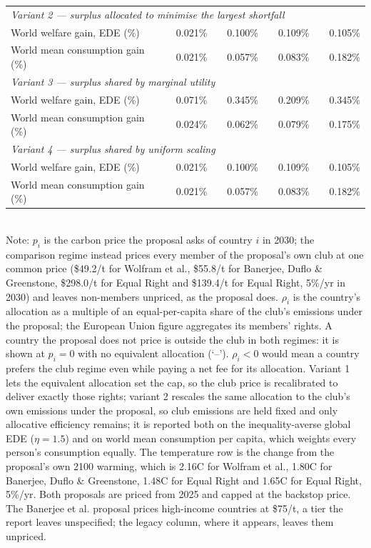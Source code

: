 \begin{table}[htbp]
\begin{tabular}{lcccccccc}
  \midrule
  \multicolumn{9}{l}{\textit{Variant 2 --- surplus allocated to minimise the largest shortfall}} \\
  \quad World welfare gain, EDE (\%) &  & 0.021\% &  & 0.100\% &  & 0.109\% &  & 0.105\% \\
  \quad World mean consumption gain (\%) &  & 0.021\% &  & 0.057\% &  & 0.083\% &  & 0.182\% \\
  \midrule
  \multicolumn{9}{l}{\textit{Variant 3 --- surplus shared by marginal utility}} \\
  \quad World welfare gain, EDE (\%) &  & 0.071\% &  & 0.345\% &  & 0.209\% &  & 0.345\% \\
  \quad World mean consumption gain (\%) &  & 0.024\% &  & 0.062\% &  & 0.079\% &  & 0.175\% \\
  \midrule
  \multicolumn{9}{l}{\textit{Variant 4 --- surplus shared by uniform scaling}} \\
  \quad World welfare gain, EDE (\%) &  & 0.021\% &  & 0.100\% &  & 0.109\% &  & 0.105\% \\
  \quad World mean consumption gain (\%) &  & 0.021\% &  & 0.057\% &  & 0.083\% &  & 0.182\% \\
  \bottomrule
\end{tabular}
\label{tab:equiv_rights_A}
\\[4pt]
{\footnotesize Note: $p_i$ is the carbon price the proposal asks of country $i$ in 2030; the comparison regime instead prices every member of the proposal's own club at one common price (\$49.2/t for Wolfram et al., \$55.8/t for Banerjee, Duflo \& Greenstone, \$298.0/t for Equal Right and \$139.4/t for Equal Right, 5\%/yr in 2030) and leaves non-members unpriced, as the proposal does. $\rho_i$ is the country's allocation as a multiple of an equal-per-capita share of the club's emissions under the proposal; the European Union figure aggregates its members' rights. A country the proposal does not price is outside the club in both regimes: it is shown at $p_i=0$ with no equivalent allocation (`--'). $\rho_i < 0$ would mean a country prefers the club regime even while paying a net fee for its allocation. Variant 1 lets the equivalent allocation set the cap, so the club price is recalibrated to deliver exactly those rights; variant 2 rescales the same allocation to the club's own emissions under the proposal, so club emissions are held fixed and only allocative efficiency remains; it is reported both on the inequality-averse global EDE ($\eta=1.5$) and on world mean consumption per capita, which weights every person's consumption equally. The temperature row is the change from the proposal's own 2100 warming, which is 2.16\textdegree{}C for Wolfram et al., 1.80\textdegree{}C for Banerjee, Duflo \& Greenstone, 1.48\textdegree{}C for Equal Right and 1.65\textdegree{}C for Equal Right, 5\%/yr. Both proposals are priced from 2025 and capped at the backstop price. The Banerjee et al. proposal prices high-income countries at \$75/t, a tier the report leaves unspecified; the legacy column, where it appears, leaves them unpriced.}
\end{table}
